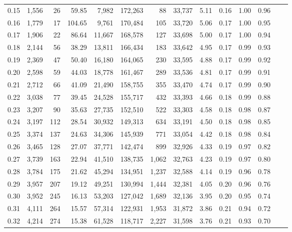 \begin{tabular}{rrrrrrrrrrrrrr}
0.15 &  1,556 &   26 &   59.85 &    7,982 &  172,263 &      88 &  33,737 &  5.11 &  0.16 &  1.00 &      0.96 \\
0.16 &  1,779 &   17 &  104.65 &    9,761 &  170,484 &     105 &  33,720 &  5.06 &  0.17 &  1.00 &      0.95 \\
0.17 &  1,906 &   22 &   86.64 &   11,667 &  168,578 &     127 &  33,698 &  5.00 &  0.17 &  1.00 &      0.94 \\
0.18 &  2,144 &   56 &   38.29 &   13,811 &  166,434 &     183 &  33,642 &  4.95 &  0.17 &  0.99 &      0.93 \\
0.19 &  2,369 &   47 &   50.40 &   16,180 &  164,065 &     230 &  33,595 &  4.88 &  0.17 &  0.99 &      0.92 \\
0.20 &  2,598 &   59 &   44.03 &   18,778 &  161,467 &     289 &  33,536 &  4.81 &  0.17 &  0.99 &      0.91 \\
0.21 &  2,712 &   66 &   41.09 &   21,490 &  158,755 &     355 &  33,470 &  4.74 &  0.17 &  0.99 &      0.90 \\
0.22 &  3,038 &   77 &   39.45 &   24,528 &  155,717 &     432 &  33,393 &  4.66 &  0.18 &  0.99 &      0.88 \\
0.23 &  3,207 &   90 &   35.63 &   27,735 &  152,510 &     522 &  33,303 &  4.58 &  0.18 &  0.98 &      0.87 \\
0.24 &  3,197 &  112 &   28.54 &   30,932 &  149,313 &     634 &  33,191 &  4.50 &  0.18 &  0.98 &      0.85 \\
0.25 &  3,374 &  137 &   24.63 &   34,306 &  145,939 &     771 &  33,054 &  4.42 &  0.18 &  0.98 &      0.84 \\
0.26 &  3,465 &  128 &   27.07 &   37,771 &  142,474 &     899 &  32,926 &  4.33 &  0.19 &  0.97 &      0.82 \\
0.27 &  3,739 &  163 &   22.94 &   41,510 &  138,735 &   1,062 &  32,763 &  4.23 &  0.19 &  0.97 &      0.80 \\
0.28 &  3,784 &  175 &   21.62 &   45,294 &  134,951 &   1,237 &  32,588 &  4.14 &  0.19 &  0.96 &      0.78 \\
0.29 &  3,957 &  207 &   19.12 &   49,251 &  130,994 &   1,444 &  32,381 &  4.05 &  0.20 &  0.96 &      0.76 \\
0.30 &  3,952 &  245 &   16.13 &   53,203 &  127,042 &   1,689 &  32,136 &  3.95 &  0.20 &  0.95 &      0.74 \\
0.31 &  4,111 &  264 &   15.57 &   57,314 &  122,931 &   1,953 &  31,872 &  3.86 &  0.21 &  0.94 &      0.72 \\
0.32 &  4,214 &  274 &   15.38 &   61,528 &  118,717 &   2,227 &  31,598 &  3.76 &  0.21 &  0.93 &      0.70 \\

\end{tabular}
